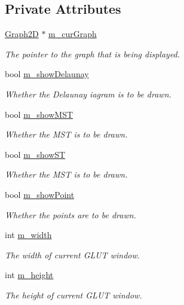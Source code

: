 \subsection*{Private Attributes}
\begin{DoxyCompactItemize}
\item 
\hyperlink{classcmst_1_1_graph2_d}{Graph2D} $\ast$ \hyperlink{classcmst_1_1_window_a86d6a605ac3dc593de030802009e73bc}{m\_curGraph}
\begin{DoxyCompactList}\small\item\em The pointer to the graph that is being displayed. \end{DoxyCompactList}\item 
bool \hyperlink{classcmst_1_1_window_a527a10c574abe1ad1e0279465b07a7f0}{m\_showDelaunay}
\begin{DoxyCompactList}\small\item\em Whether the Delaunay iagram is to be drawn. \end{DoxyCompactList}\item 
bool \hyperlink{classcmst_1_1_window_a55136499feb82b469393b5f18bb1fe88}{m\_showMST}
\begin{DoxyCompactList}\small\item\em Whether the MST is to be drawn. \end{DoxyCompactList}\item 
bool \hyperlink{classcmst_1_1_window_a8d8b71a285b5730cac0ce3fe63c91baf}{m\_showST}
\begin{DoxyCompactList}\small\item\em Whether the MST is to be drawn. \end{DoxyCompactList}\item 
bool \hyperlink{classcmst_1_1_window_a10240817a263c467d61dad604c820f52}{m\_showPoint}
\begin{DoxyCompactList}\small\item\em Whether the points are to be drawn. \end{DoxyCompactList}\item 
int \hyperlink{classcmst_1_1_window_a2955f1032cf2ab577a5f01776e46f671}{m\_width}
\begin{DoxyCompactList}\small\item\em The width of current GLUT window. \end{DoxyCompactList}\item 
int \hyperlink{classcmst_1_1_window_a9447754382ddb8894d50a40d19f027a3}{m\_height}
\begin{DoxyCompactList}\small\item\em The height of current GLUT window. \end{DoxyCompactList}\end{DoxyCompactItemize}
